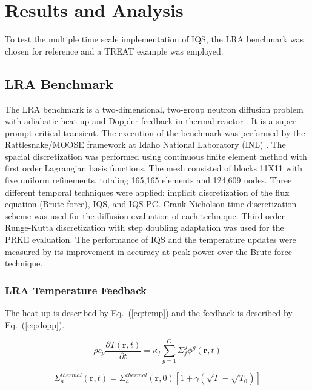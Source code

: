 \documentclass{anstrans}
\renewcommand{\vec}[1]{\bm{#1}} %
\newcommand{\eqt}[1]{Eq.~(\ref{#1})}                     %
\newcommand{\be}{\begin{equation}}
\newcommand{\ee}{\end{equation}}
\begin{document}
\section{Results and Analysis}

To test the multiple time scale implementation of IQS, the LRA benchmark was chosen for reference and a TREAT example was employed. 

\subsection{LRA Benchmark}

The LRA benchmark is a two-dimensional, two-group neutron diffusion problem with adiabatic heat-up and Doppler feedback in thermal reactor \cite{ANL_BPB}.  It is a super prompt-critical transient. The execution of the benchmark was performed by the Rattlesnake/MOOSE framework at Idaho National Laboratory (INL) \cite{wang2013}.  The spacial discretization was performed using continuous finite element method with first order Lagrangian basis functions. The mesh consisted of blocks 11X11 with five uniform refinements, totaling 165,165 elements and 124,609 nodes. Three different temporal techniques were applied: implicit discretization of the flux equation (Brute force), IQS, and IQS-PC. Crank-Nicholson time discretization scheme was used for the diffusion evaluation of each technique.  Third order Runge-Kutta discretization with step doubling adaptation was used for the PRKE evaluation.  The performance of IQS and the temperature updates were measured by its improvement in accuracy at peak power over the Brute force technique.

\subsubsection{LRA Temperature Feedback}
\label{sec:LRA_T}

The heat up is described by \eqt{eq:temp} and the feedback is described by \eqt{eq:dopp}.

\be
\rho c_p \frac{\partial T(\vec{r},t)}{\partial t} = \kappa_f \sum^G_{g=1}\Sigma_f^g \phi^g(\vec{r},t)
\label{eq:temp}
\ee

\be
\Sigma_a^{thermal}(\vec{r},t) = \Sigma_a^{thermal}(\vec{r},0)\left[1+\gamma\left(\sqrt{T}-\sqrt{T_0}\right)\right]
\label{eq:dopp}
\ee
\end{document}
